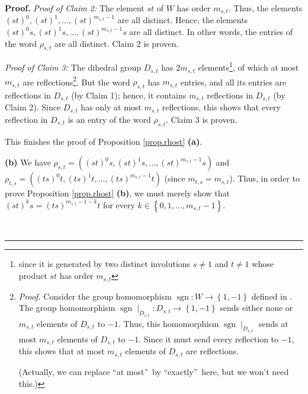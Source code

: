\documentclass
[numbers=enddot,12pt,final,onecolumn,notitlepage,abstracton]{scrartcl}%
\theoremstyle{definition}
\newenvironment{proof}[1][Proof]{\noindent\textbf{#1.} }{\ \rule{0.5em}{0.5em}}
\begin{document}
\begin{proof}
\textit{Proof of Claim 2:} The element $st$ of $W$ has order $m_{s,t}$. Thus,
the elements $\left(  st\right)  ^{0},\left(  st\right)  ^{1},\ldots,\left(
st\right)  ^{m_{s,t}-1}$ are all distinct. Hence, the elements $\left(
st\right)  ^{0}s,\left(  st\right)  ^{1}s,\ldots,\left(  st\right)
^{m_{s,t}-1}s$ are all distinct. In other words, the entries of the word
$\rho_{s,t}$ are all distinct. Claim 2 is proven.

\textit{Proof of Claim 3:} The dihedral group $D_{s,t}$ has $2m_{s,t}$
elements\footnote{since it is generated by two distinct involutions $s\neq1$
and $t\neq1$ whose product $st$ has order $m_{s,t}$}, of which at most
$m_{s,t}$ are reflections\footnote{\textit{Proof.} Consider the group
homomorphism $\operatorname*{sgn}:W\rightarrow\left\{  1,-1\right\}  $ defined
in \cite[\S 1.1]{Lusztig-Hecke}. The group homomorphism $\operatorname*{sgn}%
\mid_{D_{s,t}}:D_{s,t}\rightarrow\left\{  1,-1\right\}  $ sends either none or
$m_{s,t}$ elements of $D_{s,t}$ to $-1$. Thus, this homomorphism
$\operatorname*{sgn}\mid_{D_{s,t}}$ sends at most $m_{s,t}$ elements of
$D_{s,t}$ to $-1$. Since it must send every reflection to $-1$, this shows
that at most $m_{s,t}$ elements of $D_{s,t}$ are reflections.
\par
(Actually, we can replace \textquotedblleft at most\textquotedblright\ by
\textquotedblleft exactly\textquotedblright\ here, but we won't need this.)}.
But the word $\rho_{s,t}$ has $m_{s,t}$ entries, and all its entries are
reflections in $D_{s,t}$ (by Claim 1); hence, it contains $m_{s,t}$
reflections in $D_{s,t}$ (by Claim 2). Since $D_{s,t}$ has only at most
$m_{s,t}$ reflections, this shows that every reflection in $D_{s,t}$ is an
entry of the word $\rho_{s,t}$. Claim 3 is proven.

This finishes the proof of Proposition \ref{prop.rhost} \textbf{(a)}. \medskip

\textbf{(b)} We have $\rho_{s,t}=\left(  \left(  st\right)  ^{0}s,\left(
st\right)  ^{1}s,\ldots,\left(  st\right)  ^{m_{s,t}-1}s\right)  $ and
\newline$\rho_{t,s}=\left(  \left(  ts\right)  ^{0}t,\left(  ts\right)
^{1}t,\ldots,\left(  ts\right)  ^{m_{s,t}-1}t\right)  $ (since $m_{t,s}%
=m_{s,t}$). Thus, in order to prove Proposition \ref{prop.rhost} \textbf{(b)},
we must merely show that $\left(  st\right)  ^{k}s=\left(  ts\right)
^{m_{s,t}-1-k}t$ for every $k\in\left\{  0,1,\ldots,m_{s,t}-1\right\}  $.


\end{proof}
\end{document}
